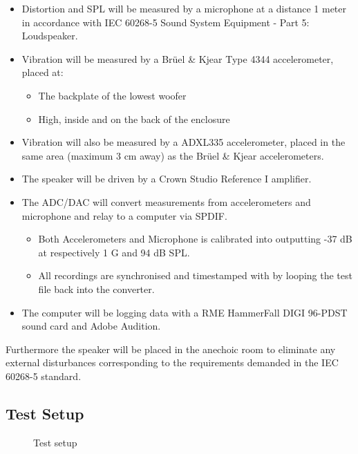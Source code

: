 \begin{itemize}
\item Distortion and \gls{SPL} will be measured by a microphone at a distance 1 meter in accordance with IEC 60268-5 Sound System Equipment - Part 5: Loudspeaker.
\item Vibration will be measured by a Brüel \& Kjear Type 4344 accelerometer, placed at:
\begin{itemize}
\item The backplate of the lowest woofer
\item High, inside and on the back of the enclosure 
\end{itemize}
\item Vibration will also be measured by a ADXL335 accelerometer, placed in the same area (maximum 3 cm away) as the Brüel \& Kjear accelerometers. 
\item The speaker will be driven by a Crown Studio Reference I amplifier.
\item The ADC/DAC will convert measurements from accelerometers and microphone and relay to a computer via SPDIF.
\begin{itemize}
\item Both Accelerometers and Microphone is calibrated into outputting -37 dB at respectively 1 G and 94 dB \gls{SPL}.
\item All recordings are synchronised and timestamped with by looping the test file back into the converter.
\end{itemize}
\item The computer will be logging data with a RME HammerFall DIGI 96-PDST sound card and Adobe Audition.
\end{itemize}

Furthermore the speaker will be placed in the anechoic room to eliminate any external disturbances corresponding to the requirements demanded in the 
IEC 60268-5 standard.

\subsection*{Test Setup}

\begin{figure}[H]
\centering
{}
\scalebox{0.7}{

}
\caption{Test setup}
\label{figure:SpeakertestSetup2}
\end{figure}

